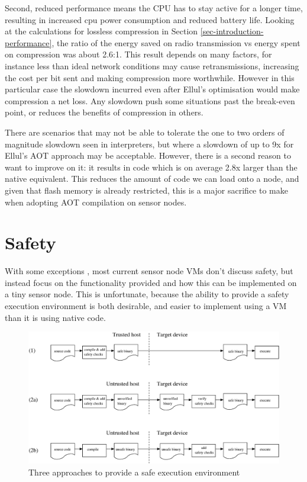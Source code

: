 Second, reduced performance means the CPU has to stay active for a longer time, resulting in increased cpu power consumption and reduced battery life. Looking at the calculations for lossless compression in Section \ref{sec-introduction-performance}, the ratio of the energy saved on radio transmission vs energy spent on compression was about 2.6:1. This result depends on many factors, for instance less than ideal network conditions may cause retransmissions, increasing the cost per bit sent and making compression more worthwhile. However in this particular case the slowdown incurred even after Ellul's optimisation would make compression a net loss. Any slowdown push some situations past the break-even point, or reduces the benefits of compression in others.

There are scenarios that may not be able to tolerate the one to two orders of magnitude slowdown seen in interpreters, but where a slowdown of up to 9x for Ellul's AOT approach may be acceptable. However, there is a second reason to want to improve on it: it results in code which is on average 2.8x larger than the native equivalent. This reduces the amount of code we can load onto a node, and given that flash memory is already restricted, this is a major sacrifice to make when adopting AOT compilation on sensor nodes.


\section{Safety}
\label{sec-state-of-the-art-safety}
With some exceptions \cite{Evers:2010ur}, most current sensor node VMs don't discuss safety, but instead focus on the functionality provided and how this can be implemented on a tiny sensor node. This is unfortunate, because the ability to provide a safety execution environment is both desirable, and easier to implement using a VM than it is using native code.

\begin{figure}
\centering
\includegraphics[width=\linewidth]{safe-compilation-process.eps}
\caption{Three approaches to provide a safe execution environment}
\label{fig-safe-compilation-process}
\end{figure}

